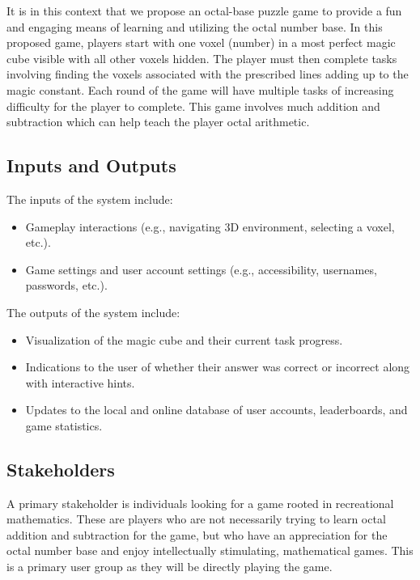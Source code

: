 \documentclass{article}
\begin{document}
It is in this context that we propose an octal-base puzzle game to provide a fun and engaging means of learning and utilizing the octal number base. In this proposed game, players start with one voxel (number) in a most perfect magic cube visible with all other voxels hidden. The player must then complete tasks involving finding the voxels associated with the prescribed lines adding up to the magic constant. Each round of the game will have multiple tasks of increasing difficulty for the player to complete. This game involves much addition and subtraction which can help teach the player octal arithmetic.

\subsection{Inputs and Outputs}

The inputs of the system include:
\begin{itemize}
    \item Gameplay interactions (e.g., navigating 3D environment, selecting a voxel, etc.).
    \item Game settings and user account settings (e.g., accessibility, usernames, passwords, etc.).
\end{itemize}

\noindent The outputs of the system include:
\begin{itemize}
    \item Visualization of the magic cube and their current task progress.
    \item Indications to the user of whether their answer was correct or incorrect along with interactive hints.
    \item Updates to the local and online database of user accounts, leaderboards, and game statistics.
\end{itemize}

\subsection{Stakeholders}

A primary stakeholder is individuals looking for a game rooted in recreational mathematics. These are players who are not necessarily trying to learn octal addition and subtraction for the game, but who have an appreciation for the octal number base and enjoy intellectually stimulating, mathematical games. This is a primary user group as they will be directly playing the game.
\end{document}
